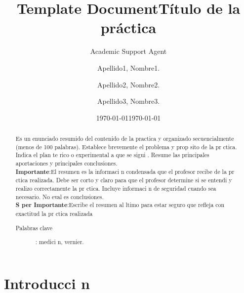 \documentclass{article}
\title{Template Document}
\author{Academic Support Agent}
\date{\today}
\begin{document}
\maketitle


\title{T\'itulo de la pr\'actica}%

\author{Apellido1, Nombre1.}
\author{Apellido2, Nombre2.}
\author{Apellido3, Nombre3.}

\date{\today}%

\begin{abstract}
Es un enunciado resumido del  contenido de  la  practica y  organizado secuencialmente  (menos de 100 palabras). Establece brevemente el problema y prop sito de la pr ctica. Indica el plan te rico o experimental a que se sigui . Resume las principales aportaciones y principales conclusiones.\\ \textbf{Importante}:El  resumen  es  la  informaci n  condensada  que  el  profesor  recibe  de  la  pr ctica realizada.  Debe  ser  corto  y  claro  para  que  el  profesor  determine  si  se  entendi   y  realizo correctamente  la  pr ctica.  Incluye  informaci n  de  seguridad  cuando  sea  necesario.  No  eval es conclusiones.\\\textbf{S per  Importante}:Escribe  el  resumen  al   ltimo  para  estar  seguro  que  refleja  con  exactitud  la pr ctica realizada
\begin{description}
\item[Palabras clave]: medici n, vernier.
\end{description}
\end{abstract}

\maketitle

%

\section{\label{sec:introduccion}Introducci n}
\end{document}
